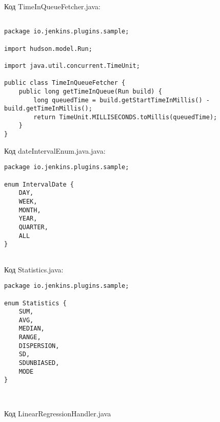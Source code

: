 Код TimeInQueueFetcher.java:

\begin{lstlisting}

package io.jenkins.plugins.sample;

import hudson.model.Run;

import java.util.concurrent.TimeUnit;

public class TimeInQueueFetcher {
    public long getTimeInQueue(Run build) {
        long queuedTime = build.getStartTimeInMillis() - build.getTimeInMillis();
        return TimeUnit.MILLISECONDS.toMillis(queuedTime);
    }
}

\end{lstlisting}

Код dateIntervalEnum.java.java:

\begin{lstlisting}
package io.jenkins.plugins.sample;

enum IntervalDate {
    DAY,
    WEEK,
    MONTH,
    YEAR,
    QUARTER,
    ALL
}


\end{lstlisting}

Код Statistics.java:

\begin{lstlisting}
package io.jenkins.plugins.sample;

enum Statistics {
    SUM,
    AVG,
    MEDIAN,
    RANGE,
    DISPERSION,
    SD,
    SDUNBIASED,
    MODE
}



\end{lstlisting}

Код LinearRegressionHandler.java

